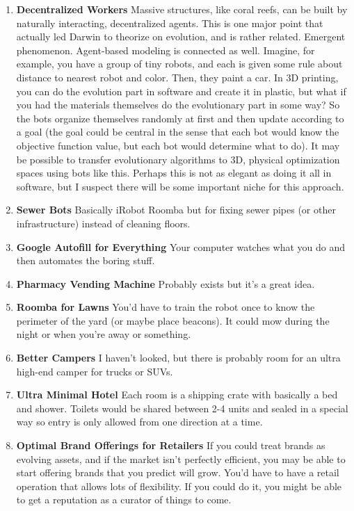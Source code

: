 \documentclass[paper=a4, fontsize=11pt]{scrartcl} %
\numberwithin{equation}{section} %
\numberwithin{figure}{section} %
\numberwithin{table}{section} %
\begin{document}
\begin{enumerate}
\item \textbf{Decentralized Workers} Massive structures, like coral reefs, can be built by naturally interacting, decentralized agents.  This is one major point that actually led Darwin to theorize on evolution, and is rather related.  Emergent phenomenon.  Agent-based modeling is connected as well.  Imagine, for example, you have a group of tiny robots, and each is given some rule about distance to nearest robot and color.  Then, they paint a car.  In 3D printing, you can do the evolution part in software and create it in plastic, but what if you had the materials themselves do the evolutionary part in some way?  So the bots organize themselves randomly at first and then update according to a goal (the goal could be central in the sense that each bot would know the objective function value, but each bot would determine what to do).  It may be possible to transfer evolutionary algorithms to 3D, physical optimization spaces using bots like this.  Perhaps this is not as elegant as doing it all in software, but I suspect there will be some important niche for this approach.

\item \textbf{Sewer Bots} Basically iRobot Roomba but for fixing sewer pipes (or other infrastructure) instead of cleaning floors.

\item \textbf{Google Autofill for Everything} Your computer watches what you do and then automates the boring stuff.

\item \textbf{Pharmacy Vending Machine} Probably exists but it's a great idea.

\item \textbf{Roomba for Lawns} You'd have to train the robot once to know the perimeter of the yard (or maybe place beacons).  It could mow during the night or when you're away or something.

\item \textbf{Better Campers} I haven't looked, but there is probably room for an ultra high-end camper for trucks or SUVs.

\item \textbf{Ultra Minimal Hotel} Each room is a shipping crate with basically a bed and shower.  Toilets would be shared between 2-4 units and sealed in a  special way so entry is only allowed from one direction at a time.

\item \textbf{Optimal Brand Offerings for Retailers} If you could treat brands as evolving assets, and if the market isn't perfectly efficient, you may be able to start offering brands that you predict will grow.  You'd have to have a retail operation that allows lots of flexibility.  If you could do it, you might be able to get a reputation as a curator of things to come.


\end{enumerate}
\end{document}
